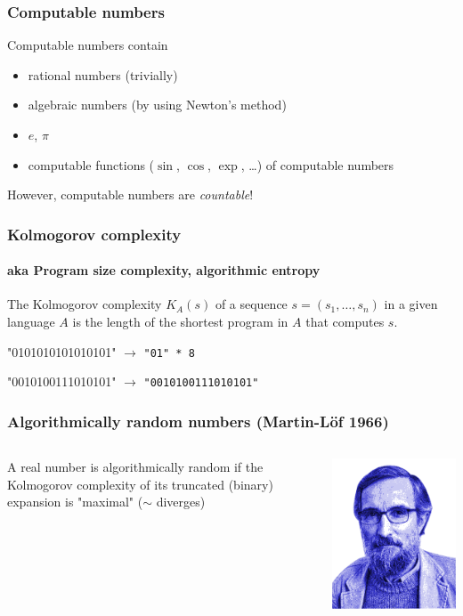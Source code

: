 \documentclass{beamer}
\begin{document}
\begin{frame}
    \frametitle{Computable numbers}
    Computable numbers contain
    \begin{itemize}
        \item rational numbers (trivially)
        \item algebraic numbers (by using Newton's method)
        \item $e$, $\pi$
        \item computable functions ($\sin$, $\cos$, $\exp$, \dots) of computable numbers
    \end{itemize}
    
    \vspace{2em}
    However, computable numbers are \textit{countable}!
\end{frame}

\begin{frame}
    \frametitle{Kolmogorov complexity}
    \framesubtitle{aka Program size complexity, algorithmic entropy}
    The Kolmogorov complexity $K_A(s)$ of a sequence $s=(s_1, \dots, s_n)$ in a given language $A$ is the length of the shortest program in $A$ that computes $s$.

    \vspace{2.5em}
    "0101010101010101" $\longrightarrow$ \texttt{"01" * 8}

    "0010100111010101" $\longrightarrow$ \texttt{"0010100111010101"}
\end{frame}

\begin{frame}
    \frametitle{Algorithmically random numbers (Martin-Löf 1966)}
    \begin{columns}
        \begin{column}{.75\textwidth}
            A real number is algorithmically random if the Kolmogorov complexity of its truncated (binary) expansion is "maximal" ($\sim$ diverges)
        \end{column}
        \begin{column}{.25\textwidth}
            \includegraphics[height=.25\textheight]{images/Per_Martin-Lof.png}
            \vfill
        \end{column}
    \end{columns}
\end{frame}
\end{document}
